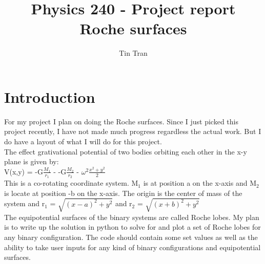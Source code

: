 \documentclass{article}
\begin{document}
\title{Physics 240 - Project report\\
		Roche surfaces}
\author{Tin Tran}

\maketitle

\section{Introduction}
For my project I plan on doing the Roche surfaces. Since I just picked this project recently, I have not made much progress regardless the actual work. But I do have a layout of what I will do for this project.\\
The effect grativational potential of two bodies orbiting each other in the x-y plane is given by:\\
V(x,y) = -G$\frac{M_1}{r_1}$ - -G$\frac{M_2}{r_2}$ - $\omega^2\frac{x^2+y^2}{2}$\\
This is a co-rotating coordinate system. M$_1$ is at position a on the x-axis and M$_2$ is locate at position -b on the x-axis. The origin is the center of mass of the system and r$_1$ = $\sqrt{(x-a)^2+y^2}$ and r$_2$ = $\sqrt{(x+b)^2+y^2}$\\
The equipotential surfaces of the binary systems are called Roche lobes. My plan is to write up the solution in python to solve for and plot a set of Roche lobes for any binary configuration. The code should contain some set values as well as the ability to take user inputs for any kind of binary configurations and equipotential surfaces.
\end{document}
